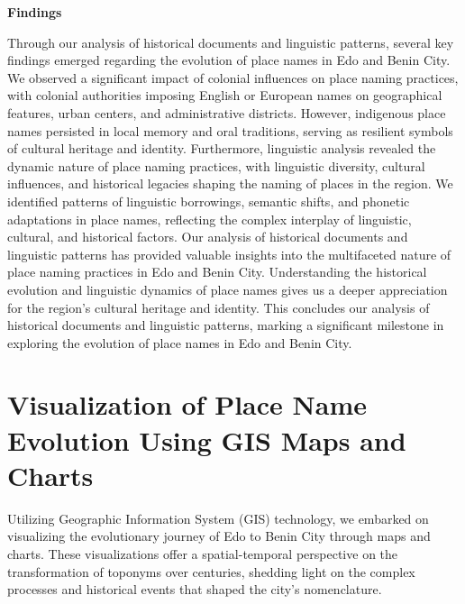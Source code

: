 \textbf{Findings}

Through our analysis of historical documents and linguistic patterns, several key findings emerged regarding the evolution of place names in Edo and Benin City. We observed a significant impact of colonial influences on place naming practices, with colonial authorities imposing English or European names on geographical features, urban centers, and administrative districts. However, indigenous place names persisted in local memory and oral traditions, serving as resilient symbols of cultural heritage and identity.
Furthermore, linguistic analysis revealed the dynamic nature of place naming practices, with linguistic diversity, cultural influences, and historical legacies shaping the naming of places in the region. We identified patterns of linguistic borrowings, semantic shifts, and phonetic adaptations in place names, reflecting the complex interplay of linguistic, cultural, and historical factors.
Our analysis of historical documents and linguistic patterns has provided valuable insights into the multifaceted nature of place naming practices in Edo and Benin City. Understanding the historical evolution and linguistic dynamics of place names gives us a deeper appreciation for the region's cultural heritage and identity.
This concludes our analysis of historical documents and linguistic patterns, marking a significant milestone in exploring the evolution of place names in Edo and Benin City.

\section{Visualization of Place Name Evolution Using GIS Maps and Charts}

Utilizing Geographic Information System (GIS) technology, we embarked on visualizing the evolutionary journey of Edo to Benin City through maps and charts. These visualizations offer a spatial-temporal perspective on the transformation of toponyms over centuries, shedding light on the complex processes and historical events that shaped the city's nomenclature.

